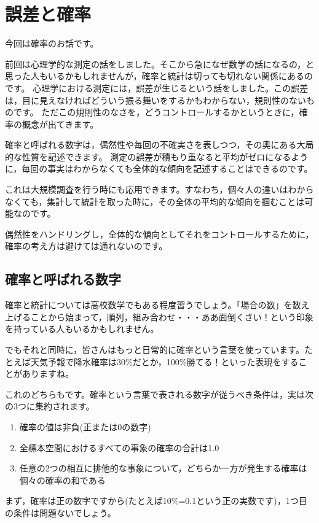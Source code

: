 \documentclass{ltjbook}
\begin{document}
\VerbatimFootnotes
\chapter{誤差と確率}
\label{m07_probability}
今回は確率のお話です。

前回は心理学的な測定の話をしました。そこから急になぜ数学の話になるの，と思った人もいるかもしれませんが，確率と統計は切っても切れない関係にあるのです。
心理学における測定には，誤差が生じるという話をしました。この誤差は，目に見えなければどういう振る舞いをするかもわからない，規則性のないものです。
ただこの規則性のなさを，どうコントロールするかというときに，確率の概念が出てきます。

確率と呼ばれる数字は，偶然性や毎回の不確実さを表しつつ，その奥にある大局的な性質を記述できます。
測定の誤差が積もり重なると平均がゼロになるように，毎回の事実はわからなくても全体的な傾向を記述することはできるのです。

これは大規模調査を行う時にも応用できます。すなわち，個々人の違いはわからなくても，集計して統計を取った時に，その全体の平均的な傾向を掴むことは可能なのです。

偶然性をハンドリングし，全体的な傾向としてそれをコントロールするために，確率の考え方は避けては通れないのです。

\section{確率と呼ばれる数字}
確率と統計については高校数学でもある程度習うでしょう。「場合の数」を数え上げることから始まって，順列，組み合わせ・・・ああ面倒くさい！という印象を持っている人もいるかもしれません。

でもそれと同時に，皆さんはもっと日常的に確率という言葉を使っています。たとえば天気予報で降水確率は30\%だとか，100\%勝てる！といった表現をすることがありますね。

これのどちらもです。確率という言葉で表される数字が従うべき条件は，実は次の3つに集約されます。
\begin{enumerate}
	\item 確率の値は非負(正または0の数字)
	\item 全標本空間におけるすべての事象の確率の合計は1.0
	\item 任意の2つの相互に排他的な事象について，どちらか一方が発生する確率は個々の確率の和である
\end{enumerate}

まず，確率は正の数字ですから(たとえば10\%=0.1という正の実数です)，1つ目の条件は問題ないでしょう。
\end{document}

